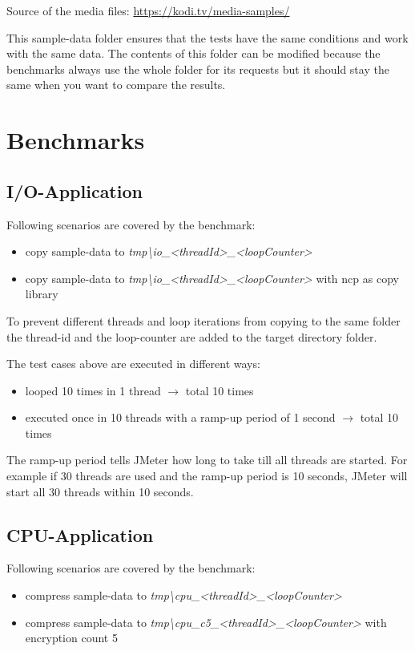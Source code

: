 Source of the media files: \url{https://kodi.tv/media-samples/}

This sample-data folder ensures that the tests have the same conditions and work with the same data. The contents of this folder can be modified because the benchmarks always use the whole folder for its requests but it should stay the same when you want to compare the results.
\section{Benchmarks}
\label{sec:benchmarks}
	\subsection{I/O-Application}
	\label{subsec:io-bechmark}
	Following scenarios are covered by the benchmark:
	\begin{itemize}
		\item copy sample-data to \textit{tmp\textbackslash io\_<threadId>\_<loopCounter>}
		\item copy sample-data to \textit{tmp\textbackslash io\_<threadId>\_<loopCounter>} with ncp as copy library
	\end{itemize}
	
	To prevent different threads and loop iterations from copying to the same folder the thread-id and the loop-counter are added to the target directory folder.
	
	The test cases above are executed in different ways:
	\begin{itemize}
		\item looped 10 times in 1 thread $\rightarrow$ total 10 times
		\item executed once in 10 threads with a ramp-up period of 1 second  $\rightarrow$ total 10 times
	\end{itemize}
	The ramp-up period tells JMeter how long to take till all threads are started. For example if 30 threads are used and the ramp-up period is 10 seconds, JMeter will start all 30 threads within 10 seconds.
	\subsection{CPU-Application}
	\label{subsec:cpu-bechmark}
		Following scenarios are covered by the benchmark:
	\begin{itemize}
		\item compress sample-data to \textit{tmp\textbackslash cpu\_<threadId>\_<loopCounter>}
		\item compress sample-data to \textit{tmp\textbackslash cpu\_c5\_<threadId>\_<loopCounter>} with encryption count 5
	\end{itemize}
	
